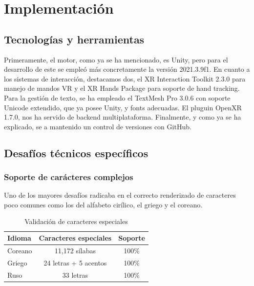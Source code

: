 \section{Implementación}
\subsection{Tecnologías y herramientas}

Primeramente, el motor, como ya se ha mencionado, es Unity, pero para el desarrollo de este se empleó más concretamente la versión 2021.3.9f1. En cuanto a los sistemas de interacción, destacamos dos, el XR Interaction Toolkit 2.3.0 para manejo de mandos VR y el XR Hands Package para soporte de hand tracking. Para la gestión de texto, se ha empleado el TextMesh Pro 3.0.6 con soporte Unicode extendido, que ya posee Unity, y fonts adecuadas. El pluguin OpenXR 1.7.0, nos ha servido de backend multiplataforma. Finalmente, y como ya se ha explicado, se a mantenido un control de versiones con  GitHub.


\subsection{Desafíos técnicos específicos}

\subsubsection{Soporte de carácteres complejos}
Uno de los mayores desafíos radicaba en el correcto renderizado de caracteres poco comunes como los del alfabeto cirílico, el griego y el coreano.

\begin{table}[h]
	\centering
	\begin{tabular}{|l|c|c|}
		\hline
		\textbf{Idioma} & \textbf{Caracteres especiales} & \textbf{Soporte} \\ \hline
		Coreano         & 11,172 sílabas                 & 100\%           \\ \hline
		Griego          & 24 letras + 5 acentos          & 100\%           \\ \hline
		Ruso            & 33 letras                      & 100\%           \\ \hline
	\end{tabular}
	\caption{Validación de caracteres especiales}
	\label{tab:caracteres}
\end{table}

